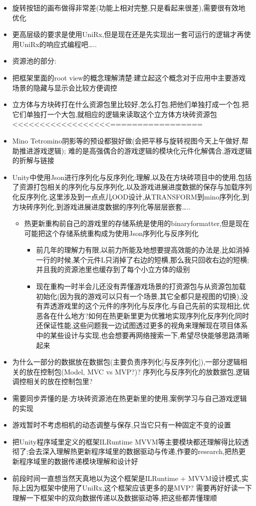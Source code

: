 \documentclass[9pt, b5paper]{article}
\begin{document}
\begin{itemize}
\item 旋转按钮的画布做得非常差(功能上相对完整,只是看起来很差),需要很有效地优化
\item 更高层级的要求是使用UniRx,但是现在还是先实现出一套可运行的逻辑才再使用UniRx的响应式编程吧\ldots{}..
\item 资源池的部分:
\item 把框架里面的root view的概念理解清楚:建立起这个概念对于应用中主要游戏场景的隐藏与显示会比较方便调控
\item 立方体与方块砖打在什么资源包里比较好,怎么打包,把他们单独打成一个包.把它们单独打一个大包,就相应的逻辑来读取这个立方体方块砖资源包<<<<<<<<<<<<<<<<<<=================
\item Mino Tetromino阴影等的预设都狠好做(会把平移与旋转视图今天上午做好,帮助推进游戏逻辑); 难的是高强偶合的游戏逻辑的模块化元件化解偶合,游戏逻辑的折解与链接
\item Unity中使用Json进行序列化与反序列化:理解,以及在方块砖项目中的使用,包括了资源打包相关的序列化与反序列化,以及游戏进展进度数据的保存与加载序列化反序列化.这里涉及到一点点儿OOD设计,从TRANSFORM到mino序列化,到方块砖序列化,到游戏进展进度数据的序列化等层层嵌套\ldots{}..
\begin{itemize}
\item 热更新重构前自己的游戏里的存储系统是使用的binaryformatter,但是现在可能把这个存储系统重构成为使用Json序列化与反序列化
\begin{itemize}
\item 前几年的理解力有限,以前力所能及地想要提高效能的办法是,比如消掉一行的时候,某个元件L只消掉了右边的短横,那么我只回收右边的短横;并且我的资源池里也缓存到了每个小立方体的级别
\item 现在重构一时半会儿还没有弄懂游戏场景的打资源包与从资源包加载初始化(因为我的游戏可以只有一个场景,其它全都只是视图的切换),没有弄透游戏里的这个元件的序列化与反序化,与自己先前的实现相比,优恶各在什么地方?如何在热更新里更为优雅地实现序列化反序列化同时还保证性能,这些问题我一边试图透过更多的视角来理解现在项目体系中的某些设计与实现,也会想要再网络搜索一下,希望尽快能够思路清晰起来
\end{itemize}
\end{itemize}
\item 为什么一部分的数据放在数据包(主要负责序列化[与反序列化]),一部分逻辑相关的放在控制包(Model, MVC vs MVP?)? 序列化与反序列化的放数据包,逻辑调控相关的放在控制包里?
\item 需要同步弄懂的是:方块砖资源池在热更新里的使用,案例学习与自己游戏逻辑的实现
\item 游戏暂时不考虑相机的动态调整与保存,只当它只有一种固定不变的设置
\item 把Unity程序域里定义的框架ILRuntime MVVM等主要模块都还理解得比较透彻了;会去深入理解热更新程序域里的数据驱动与传递,作要的research,把热更新程序域里的数据传递模块理解和设计好
\item 前段时间一直想当然天真地以为这个框架是ILRuntime + MVVM设计模式,实际上因为框架中使用了UniRx,这个框架应该更多的是MVP? 需要再好好读一下理解一下框架中的双向数据传递以及数据驱动等,把这些都弄懂理顺
\end{itemize}
\end{document}
